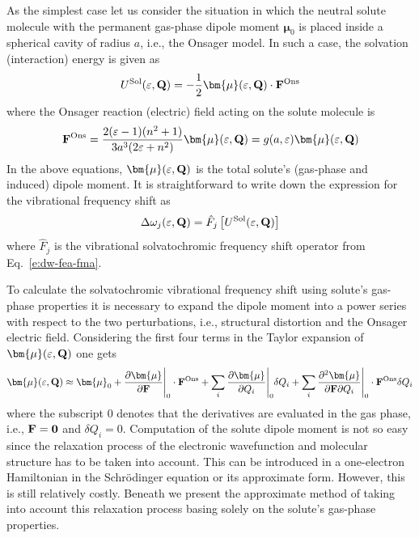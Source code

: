\documentclass[b5paper,oneside,fleqn,11pt]{book}
\newcommand{\BM}[1]{\bm{#1}}
\newcommand{\fderiv}[2]{\ensuremath{
    \frac{\partial #1}{\partial #2}}}
\newcommand{\sderivd}[3]{\ensuremath{
    \frac{\partial^2 #1}{\partial #2 \partial #3}
    }}
\begin{document}
\begin{refsection}
As the simplest case let us consider the situation
in which the neutral solute molecule with the permanent gas\hyp{}phase 
dipole moment ${\BM \mu}_0$
is placed inside a spherical cavity of radius $a$, i.e., the 
Onsager model. 
In such a case, the solvation (interaction) energy is given as
%
\begin{equation} \label{e:esol-onsager}
 U^{\rm Sol}(\varepsilon, {\bf Q}) =
 -\frac{1}{2} {\BM \mu}(\varepsilon, {\bf Q}) \cdot {\bf F}^{\rm Ons}
\end{equation}
%
where the Onsager reaction (electric) field acting on the solute molecule
is
%
\begin{equation} \label{e:fons}
  {\bf F}^{\rm Ons} = \frac{2(\varepsilon-1)(n^2+1)}{3a^3(2\varepsilon+n^2)} {\BM \mu}(\varepsilon, {\bf Q})
 = g(a,\varepsilon) {\BM \mu}(\varepsilon, {\bf Q})
\end{equation}
%
In the above equations, ${\BM \mu}(\varepsilon, {\bf Q})$ 
is the total solute's (gas\hyp{}phase and induced) dipole moment.
It is straightforward to write down the expression for the
vibrational frequency shift as
%
\begin{equation} \label{e:dw-ons-gen}
  \Delta\omega_j(\varepsilon, {\bf Q}) = \hat{F}_j \left[ U^{\rm Sol}(\varepsilon, {\bf Q}) \right]
\end{equation}
%
where $\hat{F}_j$ is the vibrational solvatochromic frequency shift 
operator from Eq.~\eqref{e:dw-fea-fma}.

To calculate the solvatochromic vibrational frequency shift
using solute's gas\hyp{}phase properties it is necessary to expand
the dipole moment into a power series with respect to the two perturbations,
i.e., structural distortion and the Onsager electric field. Considering the first
four terms in the Taylor expansion of ${\BM \mu}(\varepsilon, {\bf Q})$ one gets
%
\begin{equation} \label{e:mu-qf}
 {\BM \mu}(\varepsilon, {\bf Q}) \approx 
 {\BM \mu}_0 + \fderiv{{\BM \mu}}{\bf F}\Bigg|_{0}  \cdot {\bf F}^{\rm Ons}
 + \sum_i \fderiv{{\BM \mu}}{Q_i}\Bigg|_{0} \delta Q_i 
 + \sum_i \sderivd{{\BM \mu}}{{\bf F}}{Q_i}\Bigg|_{0} \cdot {\bf F}^{\rm Ons} \delta Q_i
\end{equation}
%
where the subscript $0$ denotes that the derivatives are evaluated in the gas phase,
i.e., ${\bf F}={\bf 0}$ and $\delta Q_i=0$. Computation of the solute dipole
moment is not so easy since the relaxation process of the electronic wavefunction
and molecular structure has to be taken into account. This can 
be introduced in a one\hyp{}electron Hamiltonian in the Schr{\"o}dinger equation
or its approximate form. However, this is still relatively costly. Beneath
we present the approximate method of taking into account
this relaxation process basing solely on the solute's gas\hyp{}phase properties.


\end{refsection}
\end{document}
